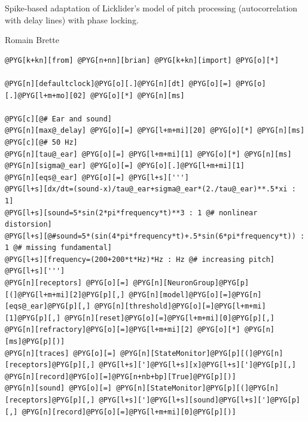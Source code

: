 \documentclass[letterpaper,10pt,english]{manual}
\begin{document}
Spike-based adaptation of Licklider's model of pitch processing (autocorrelation with
delay lines) with phase locking.

Romain Brette

\begin{Verbatim}[commandchars=@\[\]]
@PYG[k+kn][from] @PYG[n+nn][brian] @PYG[k+kn][import] @PYG[o][*]

@PYG[n][defaultclock]@PYG[o][.]@PYG[n][dt] @PYG[o][=] @PYG[o][.]@PYG[l+m+mo][02] @PYG[o][*] @PYG[n][ms]

@PYG[c][@# Ear and sound]
@PYG[n][max@_delay] @PYG[o][=] @PYG[l+m+mi][20] @PYG[o][*] @PYG[n][ms] @PYG[c][@# 50 Hz]
@PYG[n][tau@_ear] @PYG[o][=] @PYG[l+m+mi][1] @PYG[o][*] @PYG[n][ms]
@PYG[n][sigma@_ear] @PYG[o][=] @PYG[o][.]@PYG[l+m+mi][1]
@PYG[n][eqs@_ear] @PYG[o][=] @PYG[l+s][''']
@PYG[l+s][dx/dt=(sound-x)/tau@_ear+sigma@_ear*(2./tau@_ear)**.5*xi : 1]
@PYG[l+s][sound=5*sin(2*pi*frequency*t)**3 : 1 @# nonlinear distorsion]
@PYG[l+s][@#sound=5*(sin(4*pi*frequency*t)+.5*sin(6*pi*frequency*t)) : 1 @# missing fundamental]
@PYG[l+s][frequency=(200+200*t*Hz)*Hz : Hz @# increasing pitch]
@PYG[l+s][''']
@PYG[n][receptors] @PYG[o][=] @PYG[n][NeuronGroup]@PYG[p][(]@PYG[l+m+mi][2]@PYG[p][,] @PYG[n][model]@PYG[o][=]@PYG[n][eqs@_ear]@PYG[p][,] @PYG[n][threshold]@PYG[o][=]@PYG[l+m+mi][1]@PYG[p][,] @PYG[n][reset]@PYG[o][=]@PYG[l+m+mi][0]@PYG[p][,] @PYG[n][refractory]@PYG[o][=]@PYG[l+m+mi][2] @PYG[o][*] @PYG[n][ms]@PYG[p][)]
@PYG[n][traces] @PYG[o][=] @PYG[n][StateMonitor]@PYG[p][(]@PYG[n][receptors]@PYG[p][,] @PYG[l+s][']@PYG[l+s][x]@PYG[l+s][']@PYG[p][,] @PYG[n][record]@PYG[o][=]@PYG[n+nb+bp][True]@PYG[p][)]
@PYG[n][sound] @PYG[o][=] @PYG[n][StateMonitor]@PYG[p][(]@PYG[n][receptors]@PYG[p][,] @PYG[l+s][']@PYG[l+s][sound]@PYG[l+s][']@PYG[p][,] @PYG[n][record]@PYG[o][=]@PYG[l+m+mi][0]@PYG[p][)]


\end{Verbatim}
\end{document}
